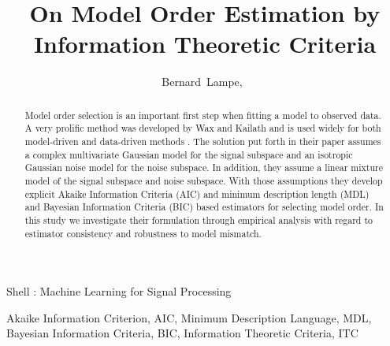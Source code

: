 \documentclass[journal]{IEEEtran}
\begin{document}
\title{On Model Order Estimation by Information Theoretic Criteria}

\author{Bernard~Lampe,~}

{Shell \MakeLowercase{\Lampe}: Machine Learning for Signal Processing}

\maketitle

\begin{abstract}
Model order selection is an important first step when fitting a model to observed data. A very prolific method was developed by Wax and Kailath and is used widely for both model-driven and data-driven methods \cite{wax}. The solution put forth in their paper assumes a complex multivariate Gaussian model for the signal subspace and an isotropic Gaussian noise model for the noise subspace. In addition, they assume a linear mixture model of the signal subspace and noise subspace. With those assumptions they develop explicit Akaike Information Criteria (AIC) and minimum description length (MDL) and Bayesian Information Criteria (BIC) based estimators for selecting model order. In this study we investigate their formulation through empirical analysis with regard to estimator consistency and robustness to model mismatch.
\end{abstract}

\begin{IEEEkeywords}
Akaike Information Criterion, AIC, Minimum Description Language, MDL, Bayesian Information Criteria, BIC, Information Theoretic Criteria, ITC
\end{IEEEkeywords}

\end{document}
